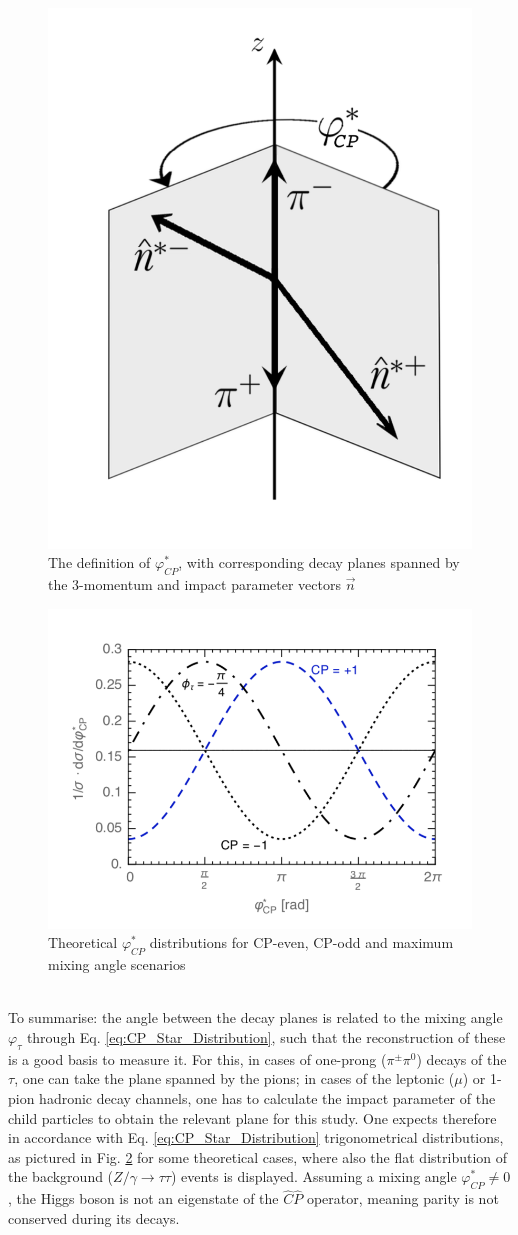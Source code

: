\begin{figure}[h]
	\centering
	\includegraphics[width=0.4\linewidth]{Figures/decay_planes_phi_Star}
	\caption{The definition of $\varphi_{CP}^*$, with corresponding decay planes spanned by the 3-momentum and impact parameter vectors $\vec{n}$ \parencite{Berge_CP_Prospects}}
	\label{fig:decayplanesphistar}
\end{figure}
\begin{figure}[h]
	\centering
	\includegraphics[width=0.6\linewidth]{Figures/Phi_star_distribution}
	\caption{Theoretical $\varphi_{CP}^*$ distributions for CP-even, CP-odd and maximum mixing angle scenarios \parencite{Berge_CP_Prospects}}
	\label{fig:phistardistribution}
\end{figure}\\
To summarise: the angle between the decay planes is related to the mixing angle $\varphi_\tau$ through Eq. \ref{eq:CP_Star_Distribution}, such that the reconstruction of these is a good basis to measure it. For this, in cases of one-prong ($\pi^\pm\pi^0$) decays of the $\tau$, one can take the plane spanned by the pions; in cases of the leptonic ($\mu$) or 1-pion hadronic decay channels, one has to calculate the impact parameter of the child particles to obtain the relevant plane for this study. One expects therefore in accordance with Eq. \ref{eq:CP_Star_Distribution} trigonometrical distributions, as pictured in Fig. \ref{fig:phistardistribution} for some theoretical cases, where also the flat distribution of the background ($Z/\gamma \rightarrow \tau\tau$) events is displayed. Assuming a mixing angle $\varphi_{CP}^* \neq 0$, the Higgs boson is not an eigenstate of the $\hat{C}\hat{P}$ operator, meaning parity is not conserved during its decays.


